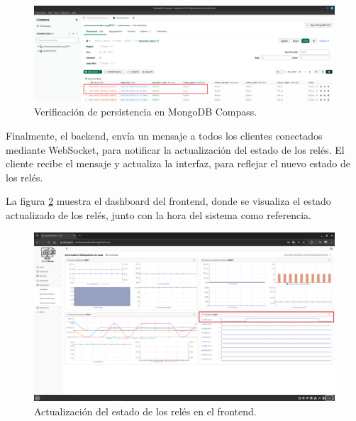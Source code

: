 \begin{figure}[H]
    \centering
    \includegraphics[width=\textwidth]{Images/59_prueba_integral_6.png}
    \caption[Verificación de persistencia en MongoDB Compass]{Verificación de persistencia en MongoDB Compass.}
    \label{fig:prueba_integral_6}
\end{figure}

Finalmente, el backend, envía un mensaje a todos los clientes conectados
mediante WebSocket, para notificar la actualización del estado de los relés. El
cliente recibe el mensaje y actualiza la interfaz, para reflejar el nuevo
estado de los relés.

La figura \ref{fig:prueba_integral_7} muestra el dashboard del frontend, donde
se visualiza el estado actualizado de los relés, junto con la hora del sistema
como referencia.

\begin{figure}[H]
    \centering
    \includegraphics[width=\textwidth]{Images/59_prueba_integral_7.png}
    \caption[Actualización del estado de los relés en el frontend]{Actualización del estado de los relés en el frontend.}
    \label{fig:prueba_integral_7}
\end{figure}
